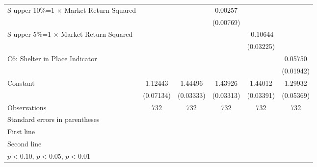 \begin{table}[htbp]
\begin{tabular}{l*{5}{c}}
S upper 10\%=1 $\times$ Market Return Squared&                     &                     &     0.00257         &                     &                     \\
                    &                     &                     &   (0.00769)         &                     &                     \\
\addlinespace

S upper 5\%=1 $\times$ Market Return Squared&                     &                     &                     &    -0.10644\sym{***}&                     \\
                    &                     &                     &                     &   (0.03225)         &                     \\
\addlinespace
C6: Shelter in Place Indicator&                     &                     &                     &                     &     0.05750\sym{***}\\
                    &                     &                     &                     &                     &   (0.01942)         \\
\addlinespace
Constant            &     1.12443\sym{***}&     1.44496\sym{***}&     1.43926\sym{***}&     1.44012\sym{***}&     1.29932\sym{***}\\
                    &   (0.07134)         &   (0.03333)         &   (0.03313)         &   (0.03391)         &   (0.05369)         \\
\midrule
Observations        &         732         &         732         &         732         &         732         &         732         \\
\bottomrule
\multicolumn{6}{l}{\footnotesize Standard errors in parentheses}\\
\multicolumn{6}{l}{\footnotesize First line}\\
\multicolumn{6}{l}{\footnotesize Second line}\\
\multicolumn{6}{l}{\footnotesize \sym{*} \(p<0.10\), \sym{**} \(p<0.05\), \sym{***} \(p<0.01\)}\\
\end{tabular}
\end{table}
